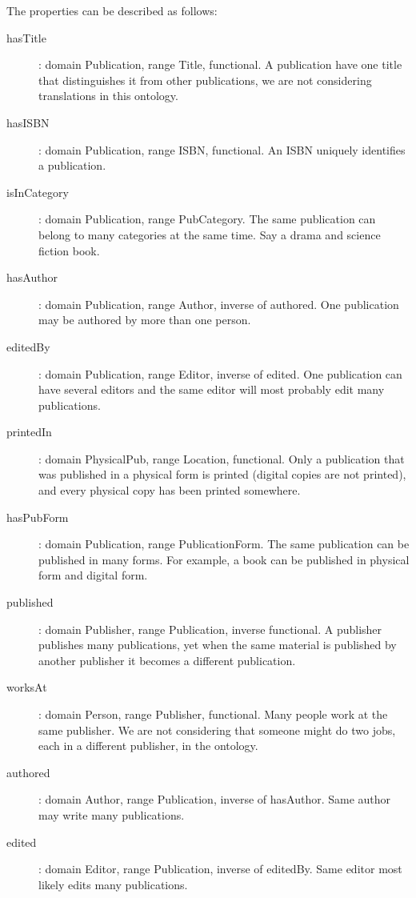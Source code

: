 \documentclass[a4paper,12pt]{article}
\begin{document}
The properties can be described as follows:
\begin{description}
\item[hasTitle]: domain Publication, range Title, functional.  A publication
have one title that distinguishes it from other publications, we are not
considering translations in this ontology.

\item[hasISBN]: domain Publication, range ISBN, functional.  An ISBN uniquely
identifies a publication.

\item[isInCategory]: domain Publication, range PubCategory.  The same
publication can belong to many categories at the same time.  Say a drama and
science fiction book.

\item[hasAuthor]: domain Publication, range Author, inverse of authored.  One
publication may be authored by more than one person.

\item[editedBy]: domain Publication, range Editor, inverse of edited.  One
publication can have several editors and the same editor will most probably
edit many publications.

\item[printedIn]: domain PhysicalPub, range Location, functional.  Only a
publication that was published in a physical form is printed (digital copies
are not printed), and every physical copy has been printed somewhere.

\item[hasPubForm]: domain Publication, range PublicationForm.  The same
publication can be published in many forms.  For example, a book can be
published in physical form and digital form.

\item[published]: domain Publisher, range Publication, inverse functional.  A
publisher publishes many publications, yet when the same material is published
by another publisher it becomes a different publication.

\item[worksAt]: domain Person, range Publisher, functional.  Many people work
at the same publisher.  We are not considering that someone might do two jobs,
each in a different publisher, in the ontology.

\item[authored]: domain Author, range Publication, inverse of hasAuthor.  Same
author may write many publications.

\item[edited]: domain Editor, range Publication, inverse of editedBy.  Same
editor most likely edits many publications.
\end{description}
\end{document}
